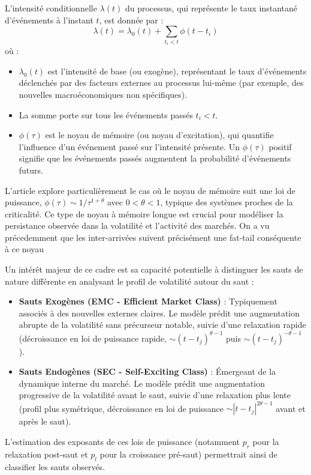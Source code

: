 \documentclass[10pt,a4paper]{article}
\theoremstyle{definition}
\theoremstyle{remark}
\begin{document}
    L'intensité conditionnelle $\lambda(t)$ du processus, qui représente le taux instantané d'événements à l'instant $t$, est donnée par \cite{marcaccioli2021exogenous} :
    \begin{equation}
    \lambda(t) = \lambda_0(t) + \sum_{t_i < t} \phi(t-t_i)
    \end{equation}
    où :
    \begin{itemize}
        \item $\lambda_0(t)$ est l'intensité de base (ou exogène), représentant le taux d'événements déclenchés par des facteurs externes au processus lui-même (par exemple, des nouvelles macroéconomiques non spécifiques).
        \item La somme porte sur tous les événements passés $t_i < t$.
        \item $\phi(\tau)$ est le noyau de mémoire (ou noyau d'excitation), qui quantifie l'influence d'un événement passé sur l'intensité présente. Un $\phi(\tau)$ positif signifie que les événements passés augmentent la probabilité d'événements futurs.
    \end{itemize}

    L'article \cite{marcaccioli2021exogenous} explore particulièrement le cas où le noyau de mémoire suit une loi de puissance, $\phi(\tau) \sim 1/\tau^{1+\theta}$ avec $0 < \theta < 1$, typique des systèmes proches de la criticalité. Ce type de noyau à mémoire longue est crucial pour modéliser la persistance observée dans la volatilité et l'activité des marchés. On a vu précedemment que les inter-arrivées suivent précisément une fat-tail conséquente à ce noyau
    
    Un intérêt majeur de ce cadre est sa capacité potentielle à distinguer les sauts de nature différente en analysant le profil de volatilité autour du saut :
    \begin{itemize}
        \item \textbf{Sauts Exogènes (EMC - Efficient Market Class)} : Typiquement associés à des nouvelles externes claires. Le modèle prédit une augmentation abrupte de la volatilité sans précurseur notable, suivie d'une relaxation rapide (décroissance en loi de puissance rapide, $\sim (t-t_j)^{\theta-1}$ puis $\sim (t-t_j)^{-\theta-1}$).
        \item \textbf{Sauts Endogènes (SEC - Self-Exciting Class)} : Émergeant de la dynamique interne du marché. Le modèle prédit une augmentation progressive de la volatilité avant le saut, suivie d'une relaxation plus lente (profil plus symétrique, décroissance en loi de puissance $\sim |t-t_j|^{2\theta-1}$ avant et après le saut).
    \end{itemize}
    L'estimation des exposants de ces lois de puissance (notamment $p_r$ pour la relaxation post-saut et $p_l$ pour la croissance pré-saut) permettrait ainsi de classifier les sauts observés.
\end{document}
